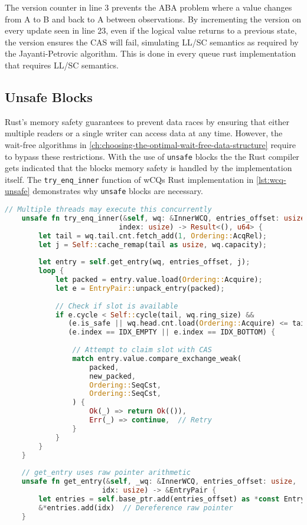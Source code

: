 The version counter in line 3 prevents the ABA problem where a value changes from A to B and back to A between observations. By incrementing the version on every update seen in line 23, even if the logical value returns to a previous state, the version ensures the \ac{CAS} will fail, simulating \ac{LL/SC} semantics as required by the Jayanti-Petrovic algorithm. This is done in every queue rust implementation that requires \ac{LL/SC} semantics.

\subsection{Unsafe Blocks}

Rust's memory safety guarantees to prevent data races by ensuring that either multiple readers or a single writer can access data at any time. However, the wait-free algorithms in \cref{ch:choosing-the-optimal-wait-free-data-structure} require to bypass these restrictions. With the use of \texttt{unsafe} blocks the the Rust compiler gets indicated that the blocks memory safety is handled by the implementation itself. The \texttt{try\_enq\_inner} function of \acsp{wCQ} Rust implementation in \cref{lst:wcq-unsafe} demonstrates why \texttt{unsafe} blocks are necessary.

\begin{lstlisting}[language=Rust, style=boxed, caption={Wait-free synchronization requiring unsafe}, label={lst:wcq-unsafe}]
    // Multiple threads may execute this concurrently
    unsafe fn try_enq_inner(&self, wq: &InnerWCQ, entries_offset: usize,
                           index: usize) -> Result<(), u64> {
        let tail = wq.tail.cnt.fetch_add(1, Ordering::AcqRel);
        let j = Self::cache_remap(tail as usize, wq.capacity);
        
        let entry = self.get_entry(wq, entries_offset, j);
        loop {
            let packed = entry.value.load(Ordering::Acquire);
            let e = EntryPair::unpack_entry(packed);
            
            // Check if slot is available
            if e.cycle < Self::cycle(tail, wq.ring_size) &&
               (e.is_safe || wq.head.cnt.load(Ordering::Acquire) <= tail) &&
               (e.index == IDX_EMPTY || e.index == IDX_BOTTOM) {
                
                // Attempt to claim slot with CAS
                match entry.value.compare_exchange_weak(
                    packed,
                    new_packed,
                    Ordering::SeqCst,
                    Ordering::SeqCst,
                ) {
                    Ok(_) => return Ok(()),
                    Err(_) => continue,  // Retry
                }
            }
        }
    }
    
    // get_entry uses raw pointer arithmetic
    unsafe fn get_entry(&self, _wq: &InnerWCQ, entries_offset: usize, 
                       idx: usize) -> &EntryPair {
        let entries = self.base_ptr.add(entries_offset) as *const EntryPair;
        &*entries.add(idx)  // Dereference raw pointer
    }
\end{lstlisting}

